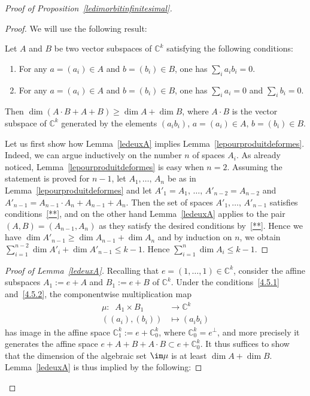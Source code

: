 \begin{proof}[Proof of Proposition~\ref{ledimorbitinfinitesimal}]
\begin{proof}
We will use the following result:

\begin{lemm}\label{ledeuxA}
Let $A$ and $B$ be two vector subspaces
of $\mathbb{C}^k$ satisfying the following conditions:
\begin{enumerate}
\item \label{4.5.1} For any $a=(a_i)\in A$ and $b=(b_i)\in B$, one has $\sum_ia_ib_i=0$.
\item \label{4.5.2} For any $a=(a_i)\in A$ and $b=(b_i)\in B$, one has $\sum_ia_i=0$ and $\sum_ib_i=0$.
\end{enumerate}
Then $\dim (A\cdot B +A+B)\geq \dim A+\dim B$, where $A\cdot B$ is the vector subspace of $\mathbb{C}^k$ generated by the elements $(a_ib_i)$, $a=(a_i)\in A,\,b=(b_i)\in B$.
\end{lemm}

Let us first show how Lemma~\ref{ledeuxA} implies Lemma~\ref{lepourproduitdeformes}. Indeed, we can argue inductively on the number $n$ of spaces $A_i$. As already noticed, Lemma~\ref{lepourproduitdeformes} is easy when $n=2$. Assuming the statement is proved for $n-1$, let $A_1,\dots,\,A_n$ be as in Lemma~\ref{lepourproduitdeformes} and let $A'_1=A_1,\,\dots,\,A'_{n-2}=A_{n-2}$ and $A'_{n-1}=A_{n-1}\cdot A_n+A_{n-1}+A_n$. Then the set of spaces $A'_1,\dots,\,A'_{n-1}$ satisfies conditions~\eqref{**}, and on the other hand Lemma~\ref{ledeuxA} applies to the pair $(A,B)=(A_{n-1},A_n)$ as they satisfy the desired conditions by~\eqref{**}. Hence we have $\dim A'_{n-1}\geq \dim A_{n-1}+ \dim A_{n}$ and by induction on $n$, we obtain $\sum_{i=1}^{n-2}\dim A'_{i}+\dim A'_{n-1}\leq k-1$. Hence $\sum_{i=1}^{n}\dim A_{i}\leq k-1$.
\end{proof}

\begin{proof}[Proof of Lemma~\ref{ledeuxA}]
Recalling that $e=(1,\dots,1)\in \mathbb{C}^k$,
consider the affine subspaces $A_1:= e+A$ and $B_1:=e+B$ of $ \mathbb{C}^k$. Under the conditions~\eqref{4.5.1} and~\eqref{4.5.2}, the componentwise multiplication map
\begin{align*}
\mu:\;\; A_1\times B_1&\rightarrow \mathbb{C}^k\\
((a_i),(b_i))&\mapsto(a_ib_i)
\end{align*}
has image in the affine space $\mathbb{C}^k_1:=e+\mathbb{C}^k_0$, where $\mathbb{C}^k_0=e^{\perp}$, and more precisely it generates the affine space $e+A+B+A\cdot B\subset e+\mathbb{C}^k_0$. It thus suffices to show that the dimension of the algebraic set $\im \mu$ is at least $\dim A+\dim B$. Lemma~\ref{ledeuxA} is thus implied by the following:


\end{proof}
\end{proof}
